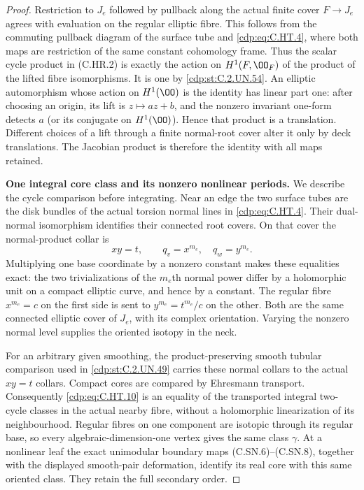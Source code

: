 \begin{proof}
Restriction to $J_e$ followed by pullback along the actual finite
cover $F\to J_e$ agrees with evaluation on the regular elliptic
fibre. This follows from the commuting pullback diagram of the
surface tube and \eqref{cdp:eq:C.HT.4}, where both maps are restriction of the
same constant cohomology frame. Thus the scalar cycle product
in (C.HR.2) is exactly the action on $H^1(F,\OO_F)$ of the product
of the lifted fibre isomorphisms. It is one by \ref{cdp:st:C.2.UN.54}.
An elliptic automorphism whose action on $H^1(\OO)$ is the identity
has linear part one: after choosing an origin, its lift is
$z\mapsto az+b$, and the nonzero invariant one-form detects $a$
(or its conjugate on $H^1(\OO)$). Hence that product is a
translation. Different choices of a lift through a finite
normal-root cover alter it only by deck translations. The
Jacobian product is therefore the identity with all maps retained.

\par\medskip\noindent\textbf{One integral core class and its nonzero nonlinear periods.}
We describe the cycle comparison before integrating. Near an
edge the two surface tubes are the disk bundles of the actual
torsion normal lines in \eqref{cdp:eq:C.HT.4}. Their dual-normal isomorphism
identifies their connected root covers. On that cover the
normal-product collar is
\[
                  xy=t,\qquad q_v=x^{m_e},\quad
                  q_w=y^{m_e}.                         \tag{C.HT.10}\label{cdp:eq:C.HT.10}
\]
Multiplying one base coordinate by a nonzero constant makes these
equalities exact: the two trivializations of the $m_e$th normal
power differ by a holomorphic unit on a compact elliptic curve,
and hence by a constant. The regular fibre $x^{m_e}=c$ on the
first side is sent to $y^{m_e}=t^{m_e}/c$ on the other. Both are
the same connected elliptic cover of $J_e$, with its complex
orientation. Varying the nonzero normal level supplies the
oriented isotopy in the neck.

For an arbitrary given smoothing, the product-preserving smooth
tubular comparison used in \ref{cdp:st:C.2.UN.49} carries these normal collars
to the actual $xy=t$ collars. Compact cores are compared by
Ehresmann transport. Consequently \eqref{cdp:eq:C.HT.10} is an equality of
the transported integral two-cycle classes in the actual nearby
fibre, without a holomorphic linearization of its neighbourhood.
Regular fibres on one component are isotopic through its regular
base, so every algebraic-dimension-one vertex gives the same
class $\gamma$. At a nonlinear leaf the exact unimodular
boundary maps (C.SN.6)--(C.SN.8), together with the displayed
smooth-pair deformation, identify its real core with this same
oriented class. They retain the full secondary order.


\end{proof}
